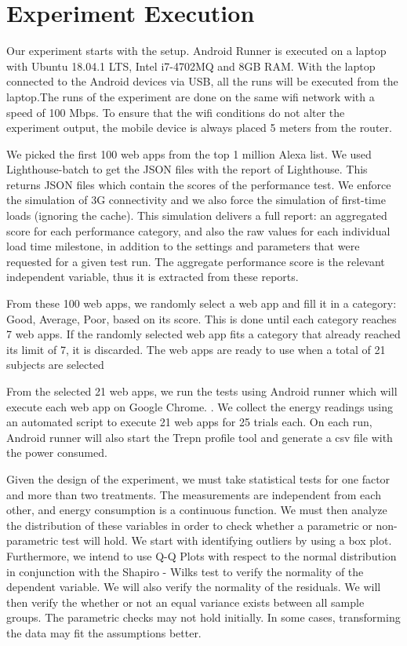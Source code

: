 \section{Experiment Execution}
Our experiment starts with the setup. Android Runner is executed on a laptop with Ubuntu 18.04.1 LTS, Intel i7-4702MQ and 8GB RAM. With the laptop connected to the Android devices via USB, all the runs will be executed from the laptop.The runs of the experiment are done on the same wifi network with a speed of 100 Mbps. To ensure that the wifi conditions do not alter the experiment output, the mobile device is always placed 5 meters from the router.

We picked the first 100 web apps from the top 1 million Alexa list. We used Lighthouse-batch to get the JSON files with the report of Lighthouse. This returns JSON files which contain the scores of the performance test. We enforce the simulation of 3G connectivity and we also force the simulation of first-time loads (ignoring the cache). This simulation delivers a full report: an aggregated score for each performance category, and also the raw values for each individual load time milestone, in addition to the settings and parameters that were requested for a given test run. The aggregate performance score is the relevant independent variable, thus it is extracted from these reports. 

From these 100 web apps, we randomly select a web app and fill it in a category: Good, Average, Poor, based on its score. This is done until each category reaches 7 web apps. If the randomly selected web app fits a category that already reached its limit of 7, it is discarded. The web apps are ready to use when a total of 21 subjects are selected

From the selected 21 web apps, we run the tests using Android runner which will execute each web app on Google Chrome. .  We collect the energy readings using an automated script to execute 21 web apps for 25 trials each. On each run, Android runner will also start the Trepn profile tool and generate a csv file with the power consumed. 
 
Given the design of the experiment, we must take statistical tests for one factor and more than two treatments. The measurements are independent from each other, and energy consumption is a continuous function. We must then analyze  the distribution of these variables in order to check whether a parametric or non-parametric test will hold.  We start with identifying outliers by using a box plot. Furthermore, we intend to use Q-Q Plots with respect to the normal distribution in conjunction with the Shapiro - Wilks test to verify the normality of the dependent variable. We will also verify the normality of the residuals. We will then verify the whether or not an equal variance exists between all sample groups. The parametric checks may not hold initially. In some cases, transforming the data may fit the assumptions better. 

